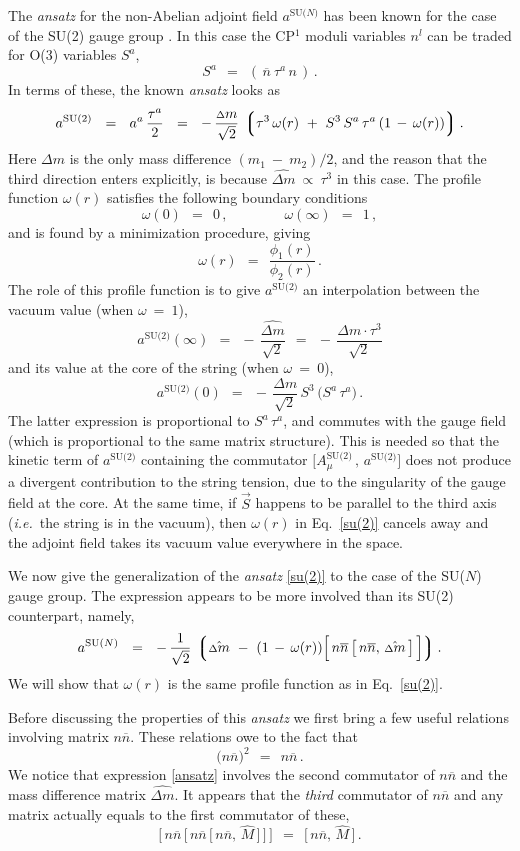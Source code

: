 \documentclass[12pt]{article}
\def\beq{\begin{equation}}
\def\eeq{\end{equation}}
\newcommand{\ov}{\overline}
\newcommand{\lgr}{\left\lgroup}
\newcommand{\rgr}{\right\rgroup}
\newcommand{\aN}{a^\text{SU($N$)}}
\newcommand{\nbar}{\ov{n}}
\newcommand{\nnbar}{n\ov{n}}
\newcommand{\dm}{\hat{{\scriptstyle \Delta} m}}
\newcommand{\deltam}{{\scriptstyle \Delta} m}
\newcommand{\ie}{{\it i.e.}~}
\newcommand{\ansatz}{{\it ansatz} }
\begin{document}
	The \ansatz for the non-Abelian adjoint field $ \aN $ has been known for the case
	of the SU(2) gauge group \cite{SYmon}.
	In this case the CP$^1$ moduli variables $ n^l $ can be traded for O(3) variables $ S^a $,
\beq
\label{S}
	S^a    ~~=~~    (\, \nbar\: \tau^a\, n \,)\,.
\eeq
	In terms of these, the known \ansatz looks as
\beq
\label{su(2)}
	a^\text{SU(2)}    ~~=~~
	a^a\, \frac{\tau^a}{2}    ~~=~~    -\, \frac{\deltam}{\sqrt{2}}\, 
		\lgr  \tau^3\, \omega(r)  ~+~  S^3\, S^a\,\tau^a\, (1 \,-\, \omega(r))  \rgr.
\eeq
	Here $ \deltam $ is the only mass difference $ (m_1 ~-~ m_2)/2 $, and the reason
	that the third direction enters explicitly, is because $ \dm ~\propto~ \tau^3 $ in this case.
	The profile function $ \omega(r) $ satisfies the following boundary conditions
\beq
	\omega(0)    ~~=~~    0\,,
	\qquad\qquad
	\omega(\infty)    ~~=~~    1\,,
\eeq
	and is found by a minimization procedure, giving
\beq
	\omega(r)    ~~=~~    \frac{\phi_1(r)}{\phi_2(r)}\,.
\eeq
	The role of this profile function is to give $ a^\text{SU(2)} $ an interpolation
	between the vacuum value (when $ \omega ~=~ 1 $),
\beq
	a^\text{SU(2)}(\infty)    ~~=~~    -\, \frac{\dm}{\sqrt{2}}    ~~=~~    -\, \frac{\deltam \cdot \tau^3}{\sqrt{2}}
\eeq
	and its value at the core of the string (when $ \omega ~=~ 0 $),
\beq
	a^\text{SU(2)}(0)    ~~=~~    -\, \frac{\deltam}{\sqrt{2}}\, S^3\, \big( S^a\, \tau^a \big)\,.
\eeq
	The latter expression is proportional to $ S^a\, \tau^a $, and commutes with the gauge field
	(which is proportional to the same matrix structure).
	This is needed so that the kinetic term of $ a^\text{SU(2)} $ containing the
	commutator $ \Big[ A^\text{SU(2)}_\mu \,,\, a^\text{SU(2)} \Big] $ does not produce 
	a divergent contribution to the string tension, due to the singularity of the gauge field at the core.
	At the same time, if $ \vec{S} $ happens to be parallel to the third axis (\ie the string is in the vacuum),
	then $ \omega(r) $ in Eq.~\eqref{su(2)} cancels away and the adjoint field takes its vacuum value everywhere in the space.

	We now give the generalization of the \ansatz \eqref{su(2)} to the case
	of the SU($N$) gauge group.
	The expression appears to be more involved than its SU(2) counterpart, namely,
\beq
\label{ansatz}
	\aN    ~~=~~    
	-\, \frac{1}{\sqrt{2}}\, 
	\lgr \dm  ~-~  (1 \,-\, \omega(r)) \Big[\, \nnbar\, \big[\, \nnbar,\, \dm \,\big] \,\Big] \rgr.
\eeq
	We will show that $ \omega(r) $ is the same profile function as in Eq.~\eqref{su(2)}.

	Before discussing the properties of this \ansatz we first bring a few useful relations
	involving matrix $ \nnbar $.
	These relations owe to the fact that 
\beq
\label{nnbarsq}
	\big( \nnbar \big)^2 ~~=~~ \nnbar\,.
\eeq
	We notice that expression \eqref{ansatz} involves the second commutator of $ \nnbar $
	and the mass difference matrix $ \dm $.
	It appears that the \emph{third} commutator of $ \nnbar $ and any matrix actually
	equals to the first commutator of these,
\beq
\label{comm}
	\Big[\, \nnbar\, \Big[\, \nnbar\, \big[\, \nnbar,\, \hat{M} \,\big] \,\Big] \,\Big]    ~~=~~
	\big[\, \nnbar,\, \hat{M} \,\big]\,.
\eeq
\end{document}
